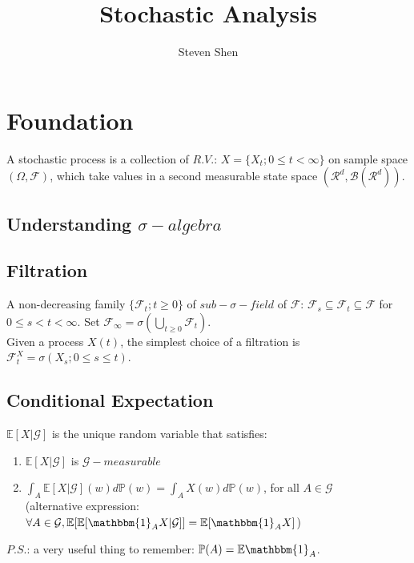 \documentclass[a4paper, 11pt]{article}
\title{\textbf{Stochastic Analysis}}
\author{Steven Shen}
\begin{document}
\maketitle

\section{Foundation}
A stochastic process is a collection of $R.V.$: $X = \{X_t; 0 \leq t < \infty\}$ on sample space $(\Omega, \mathcal{F})$, which take values in a second measurable state space $(\mathcal{R}^d, \mathcal{B}(\mathcal{R}^d))$.

\subsection{Understanding $\sigma-algebra$}

\subsection{Filtration}
A non-decreasing family $\{ \mathcal{F}_t; t \geq 0 \}$ of $sub-\sigma-field$ of $\mathcal{F}$: $\mathcal{F}_s \subseteq \mathcal{F}_t \subseteq \mathcal{F}$ for $0 \leq s < t < \infty$. Set $\mathcal{F}_{\infty} = \sigma(\bigcup_{t \geq 0}\mathcal{F}_t)$.\\
\indent Given a process $X(t)$, the simplest choice of a filtration is $\mathcal{F}_t ^X = \sigma(X_s; 0 \leq s \leq t)$.

\subsection{Conditional Expectation}
$\mathbb{E}[X|\mathcal{G}]$ is the unique random variable that satisfies:
\begin{enumerate}
	\item $\mathbb{E}[X|\mathcal{G}]$ is $\mathcal{G}-measurable$
	\item $\int_A \mathbb{E}[X|\mathcal{G}](w) d\mathbb{P}(w) = \int_A X(w) d\mathbb{P}(w)$, for all $A \in \mathcal{G}$ \\
	(alternative expression: $\forall A \in \mathcal{G}, \mathbb{E}[\mathbb{E}[\mathbbm{1}_{A}X|\mathcal{G}]] = \mathbb{E}[\mathbbm{1}_{A}X]$)
\end{enumerate}
\indent $P.S.$: a very useful thing to remember: $\mathbb{P}(A) = \mathbb{E}\mathbbm{1}_{A}$.
\end{document}
